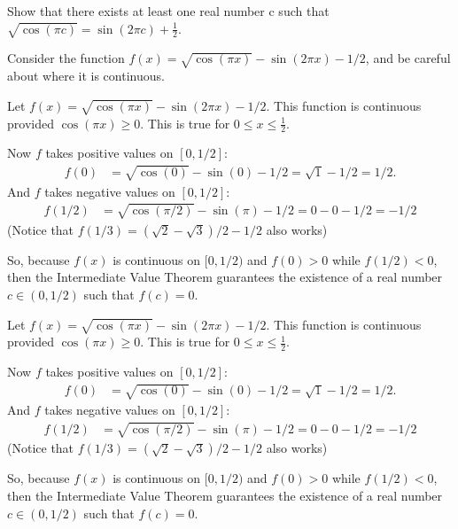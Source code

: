 \begin{question}[2015Q]
Show that there exists at least one real number c such that
$\sqrt{\cos(\pi c)} = \sin(2 \pi c) + \frac{1}{2}$.
\end{question}
\begin{hint} Consider the function $f(x) = \sqrt{\cos(\pi x)} - \sin(2\pi x) -1/2$, and be careful about where it is continuous.
\end{hint}
\begin{answer}
Let $f(x) = \sqrt{\cos(\pi x)} - \sin(2\pi x) -1/2$. This function is
continuous provided $\cos(\pi x)\geq 0$. This is  true for $0 \leq x
\leq \frac{1}{2}$.

Now $f$ takes positive values on $[0,1/2]$:
\begin{align*}
  f(0) &= \sqrt{\cos(0)} - \sin(0) -1/2 = \sqrt{1} -1/2 = 1/2.
\end{align*}
And $f$ takes negative values on $[0,1/2]$:
\begin{align*}
  f(1/2) &= \sqrt{\cos(\pi/2)}-\sin(\pi)-1/2 = 0-0-1/2 = -1/2
\end{align*}
(Notice that $f(1/3)=(\sqrt{2}-\sqrt{3})/2-1/2$ also works)

So, because $f(x)$ is continuous on $[0,1/2)$ and $f(0)>0$ while $f(1/2)<0$,
then the  Intermediate Value Theorem guarantees the existence of a real number
$c\in (0,1/2)$ such that $f(c)=0$.
\end{answer}
\begin{solution}
Let $f(x) = \sqrt{\cos(\pi x)} - \sin(2\pi x) -1/2$. This function is
continuous provided $\cos(\pi x)\geq 0$. This is  true for $0 \leq x
\leq \frac{1}{2}$.

Now $f$ takes positive values on $[0,1/2]$:
\begin{align*}
  f(0) &= \sqrt{\cos(0)} - \sin(0) -1/2 = \sqrt{1} -1/2 = 1/2.
\end{align*}
And $f$ takes negative values on $[0,1/2]$:
\begin{align*}
  f(1/2) &= \sqrt{\cos(\pi/2)}-\sin(\pi)-1/2 = 0-0-1/2 = -1/2
\end{align*}
(Notice that $f(1/3)=(\sqrt{2}-\sqrt{3})/2-1/2$ also works)

So, because $f(x)$ is continuous on $[0,1/2)$ and $f(0)>0$ while $f(1/2)<0$,
then the  Intermediate Value Theorem guarantees the existence of a real number
$c\in (0,1/2)$ such that $f(c)=0$.
\end{solution}


